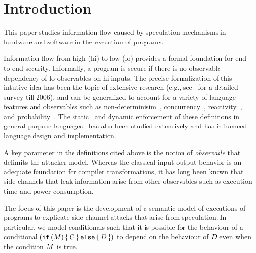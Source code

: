 \section{Introduction}

This paper studies information flow caused by speculation mechanisms
in hardware and software in the execution of programs.

Information flow from high (hi) to low (lo) provides a formal
foundation for end-to-end security.  Informally, a program is secure
if there is no observable dependency of lo-observables on hi-inputs.
The precise formalization of this intutive idea has been the topic of
extensive research (e.g., see~\cite{???}  for a detailed survey till
2006), and can be generalized to account for a variety of language
features and observables such as non-determinisim~\cite{???},
concurrency~\cite{???}, reactivity~\cite{???}, and
probability~\cite{???}. The static~\cite{???} and dynamic enforcement
of these definitions in general purpose languages~\cite{???} has also
been studied extensively and has influenced language design and
implementation.

A key parameter in the definitions cited above is the notion of
\emph{observable} that delimits the attacker model. Whereas the classical
input-output behavior is an adequate foundation for compiler
transformations, it has long been known that side-channels that leak
information arise from other observables such as execution time and
power consumption.

The focus of this paper is the development of a semantic model of
executions of programs to explicate side channel attacks that arise
from speculation. In particular, we model conditionals such that it is
possible for the behaviour of a conditional
$(\texttt{if}\,(M)\,\{\, C \,\}\,\texttt{else}\,\{\, D \,\})$ to depend on the behaviour
of $D$ even when the condition $M$ is true.

